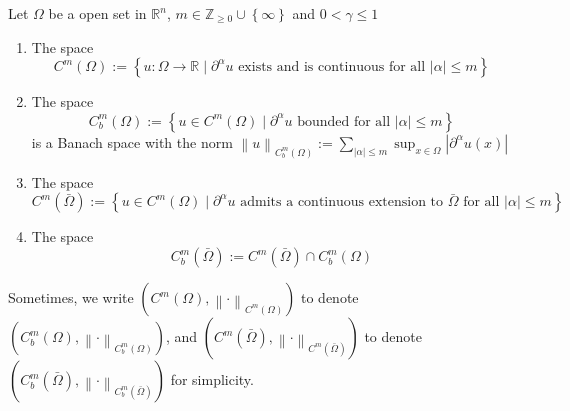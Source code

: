 \begin{definition}
    Let $\Omega$ be a open set in $\mathbb{R}^n$, $m\in \mathbb{Z}_{\geq 0}\cup \left\{\infty\right\}$ and $0<\gamma\leq 1$
    \begin{enumerate}
        \item
              The space
              \begin{equation*}
                  C^m(\Omega)
                  :=
                  \left\{u:\Omega\rightarrow \mathbb{R} \mid \partial^\alpha u \text{ exists and is continuous for all } \left|\alpha \right|\leq m \right\}
              \end{equation*}

        \item
              The space
              \begin{equation*}
                  C_b^m(\Omega)
                  :=
                  \left\{u \in C^m(\Omega) \mid \partial^\alpha u \text{ bounded for all } \left|\alpha \right|\leq m \right\}
              \end{equation*}
              is a Banach space with the norm $\left\|u\right\|_{C_b^m(\Omega)} := \sum_{\left|\alpha\right| \leq m} \sup_{x \in \Omega} \left|\partial^\alpha u(x)\right|$
        \item
              The space
              \begin{equation*}
                  C^m(\bar{\Omega})
                  :=
                  \left\{u\in C^m(\Omega)\mid  \partial^\alpha u \text{ admits a continuous extension to } \bar{\Omega} \text{ for all } \left|\alpha\right| \leq m \right\}
              \end{equation*}

        \item
              The space
              \begin{equation*}
                  C^m_b\left(\bar{\Omega}\right)
                  :=
                  C^m(\bar{\Omega})\cap C_b^m(\Omega)
              \end{equation*}
    \end{enumerate}
    \begin{remark}
        Sometimes, we write $\left(C^m(\Omega),\left\|\cdot\right\|_{C^m(\Omega)}\right)$ to denote $\left(C_b^m(\Omega),\left\|\cdot\right\|_{C_b^m(\Omega)}\right)$, and $\left(C^m(\bar{\Omega}),\left\|\cdot\right\|_{C^m(\bar{\Omega})}\right)$ to denote $\left(C_b^m(\bar{\Omega}),\left\|\cdot\right\|_{C_b^m(\bar{\Omega})}\right)$ for simplicity.
    \end{remark}
\end{definition}


